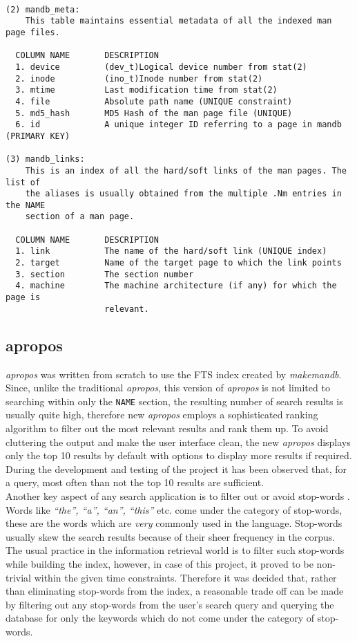 \documentclass[letterpaper,twocolumn,10pt]{article}
\begin{document}
\begin{description}
{\begin{lstlisting}[float=*]
  
(2) mandb_meta:
    This table maintains essential metadata of all the indexed man page files.

  COLUMN NAME       DESCRIPTION
  1. device         (dev_t)Logical device number from stat(2)
  2. inode          (ino_t)Inode number from stat(2)
  3. mtime          Last modification time from stat(2)
  4. file           Absolute path name (UNIQUE constraint)
  5. md5_hash       MD5 Hash of the man page file (UNIQUE)
  6. id             A unique integer ID referring to a page in mandb (PRIMARY KEY)

(3) mandb_links:
    This is an index of all the hard/soft links of the man pages. The list of
    the aliases is usually obtained from the multiple .Nm entries in the NAME
    section of a man page.

  COLUMN NAME       DESCRIPTION
  1. link           The name of the hard/soft link (UNIQUE index) 
  2. target         Name of the target page to which the link points  
  3. section        The section number
  4. machine        The machine architecture (if any) for which the page is
                    relevant.
\end{lstlisting}
}

\end{description}

\subsection{apropos}
\textit{apropos} was written from scratch to use the FTS index created by
\textit{makemandb}. Since, unlike the traditional \textit{apropos}, this version
of \textit{apropos} is not limited to searching within only the {\tt NAME}
section, the resulting
number of search results is usually quite high, therefore new \textit{apropos}
employs a
sophisticated ranking algorithm to filter out the most relevant results and rank
them up. To avoid cluttering the output and make the user interface clean, the
new \textit{apropos} displays only the top 10 results by default with options
to display more results if required. During the development and testing of the
project it has been observed that, for a query, most often than not the top 10
results are sufficient. \\

Another key aspect of any search application is to filter out or avoid stop-words
. Words like \textit{``the'', ``a'', ``an'', ``this''} etc. come under the
category of stop-words, these are the words which are \emph{very} commonly used
in the
language. Stop-words usually skew the search results because of their sheer
frequency in the corpus. The usual practice in the information retrieval world
is to filter such stop-words while building the index, however, in case of this
project, it proved to be non-trivial within the given time constraints.
Therefore it was decided that, rather than eliminating stop-words from the index,
a reasonable trade off can be made by filtering out any stop-words from the
user's search query and querying the database for only the keywords which do
not come under the category of stop-words. \\
\end{document}
